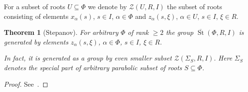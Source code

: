 \documentclass[oneside, 8pt]{amsart}
\newtheorem{theorem}{Theorem}
\newtheorem{lemma}{Lemma}
\theoremstyle{remark}
\theoremstyle{definition}
\DeclareMathOperator{\St}{St}
\numberwithin{equation}{section}
\begin{document}
\begin{comment}
For a subset of roots $S \subseteq \Phi$ denote by $\mathcal{Z}(S, R, I)$ the subset of $\overline{\St}(\Phi, R, I)$ consisting of the following two families of elements:
\begin{itemize}
 \item $x_\alpha(s)$, $\alpha \in \Phi$, $s\in I$;
 \item $z_\alpha(s, \xi)$, $\alpha \in S$, $s\in I$, $\xi \in R$.
\end{itemize}

\begin{lemma} \label{weak-Stepanov} For any $\Phi$ of rank $\geq 2$ the set $\mathcal{Z}(\Phi, R, I)$ generates $\overline{\St}(\Phi, R, I)$ as a group.
 Further, if $\Phi$ is simply laced $\overline{\St}(\Phi, R, I)$ is generated by even smaller set $\mathcal{Z}(\Phi\setminus\{\alpha, \beta\}, R, I)$, 
  where $\alpha, \beta \in \Phi$ are arbitrary roots of $\Phi$. \end{lemma}
\begin{proof}
 The first assertion is well-known, see the first part of~\cite[Lemma~4]{S15}.
 Notice that it follows from relation~\eqref{Z5} that $\mathcal{Z}(S, R, I)$ generates the same group as $\mathcal{Z}(S \cup (S - S), R, I)$.
 The second assertion then follows from the first one and the fact that for $S := \Phi \setminus \{ \alpha, \beta \}$ one has $S \cup (S - S) = \Phi$.
\end{proof}
{\bf TODO:} Probably, in the same fashion we could reprove Stepanov's theorem in the simply laced case.
\end{comment}

For a subset of roots $U \subseteq \Phi$ we denote by $\mathcal{Z}(U, R, I)$ the subset of roots consisting of elements $x_\alpha(s)$, $s \in I$, $\alpha \in \Phi$ and $z_\alpha(s, \xi)$, $\alpha \in U$, $s\in I$, $\xi \in R$.

\begin{theorem}[Stepanov] \label{thm:Stepanov} For arbitrary $\Phi$ of rank $\geq 2$ the group $\overline{\St}(\Phi, R, I)$ is generated by elements $z_\alpha(s, \xi)$, $\alpha \in \Phi$, $s \in I$, $\xi \in R$.

In fact, it is generated as a group by even smaller subset $\mathcal{Z}(\Sigma_S, R, I)$. Here $\Sigma_S$ denotes the special part of arbitrary parabolic subset of roots $S \subseteq \Phi$.
\end{theorem} \begin{proof} See~\cite[Lemma~4]{S15}. \end{proof}
\end{document}
